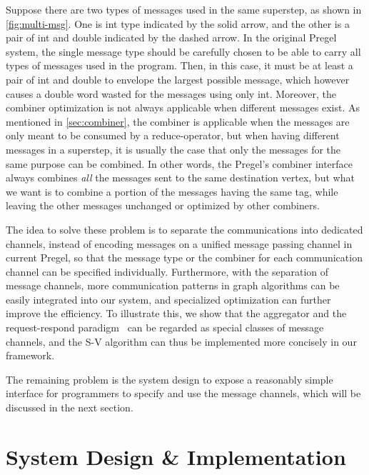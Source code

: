\documentclass{sokendai_thesis} %
\begin{document}
Suppose there are two types of messages used in the same superstep, as shown in \autoref{fig:multi-msg}.
One is int type indicated by the solid arrow, and the other is a pair of int and double indicated by the dashed arrow.
In the original Pregel system, the single message type should be carefully chosen to be able to carry all types of messages used in the program.
Then, in this case, it must be at least a pair of int and double to envelope the largest possible message, which however causes a double word wasted for the messages using only int.
Moreover, the combiner optimization is not always applicable when different messages exist.
As mentioned in \autoref{sec:combiner}, the combiner is applicable when the messages are only meant to be consumed by a reduce-operator,
but when having different messages in a superstep, it is usually the case that only the messages for the same purpose can be combined.
In other words, the Pregel's combiner interface always combines \emph{all} the messages sent to the same destination vertex, but what we want is to combine a portion of the messages having the same tag, while leaving the other messages unchanged or optimized by other combiners.

The idea to solve these problem is to separate the communications into dedicated channels, instead of encoding messages on a unified message passing channel in current Pregel, so that the message type or the combiner for each communication channel can be specified individually.
Furthermore, with the separation of message channels, more communication patterns in graph algorithms can be easily integrated into our system, and specialized optimization can further improve the efficiency.
To illustrate this, we show that the aggregator and the request-respond paradigm~\cite{pregelplus} can be regarded as special classes of message channels, and the S-V algorithm can thus be implemented more concisely in our framework.

The remaining problem is the system design to expose a reasonably simple interface for programmers to specify and use the message channels, which will be discussed in the next section.

\section{System Design \& Implementation}
\end{document}
